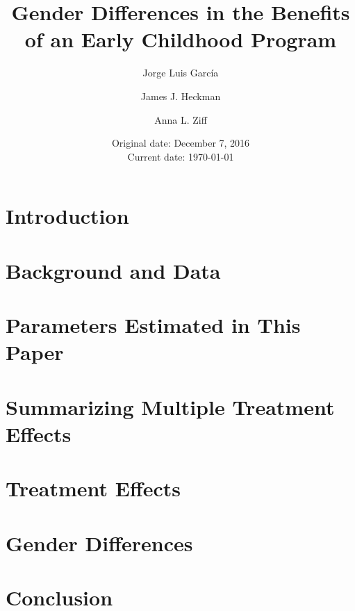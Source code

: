 







\title{Gender Differences in the Benefits of an Early Childhood Program}
\author{Jorge Luis Garc\'{i}a \and James J. Heckman \and Anna L. Ziff}
\date{Original date: December 7, 2016 \\ Current date: \today}
\maketitle

%
\tableofcontents

\doublespacing

\section{Introduction}
\label{sec:introduction}
	

\section{Background and Data}
\label{sec:data}


\section{Parameters Estimated in This Paper} 
\label{sec:parameters}


\section{Summarizing Multiple Treatment Effects}
\label{sec:combining-functions}


\section{Treatment Effects}
\label{sec:treatment-effects}


\section{Gender Differences}
\label{sec:gender-differences}


\section{Conclusion}
\label{sec:conclusion}


\clearpage
\singlespacing




